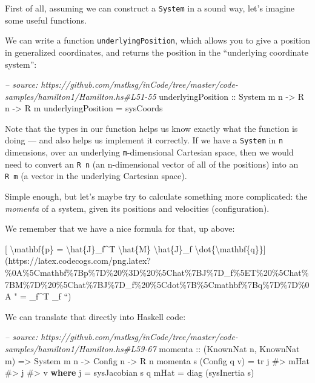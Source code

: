 \documentclass[]{article}
\newenvironment{Shaded}{}{}
\newcommand{\KeywordTok}[1]{\textcolor[rgb]{0.00,0.44,0.13}{\textbf{#1}}}
\newcommand{\DataTypeTok}[1]{\textcolor[rgb]{0.56,0.13,0.00}{#1}}
\newcommand{\CommentTok}[1]{\textcolor[rgb]{0.38,0.63,0.69}{\textit{#1}}}
\newcommand{\OtherTok}[1]{\textcolor[rgb]{0.00,0.44,0.13}{#1}}
\newcommand{\FunctionTok}[1]{\textcolor[rgb]{0.02,0.16,0.49}{#1}}
\newcommand{\NormalTok}[1]{#1}
\begin{document}
First of all, assuming we can construct a \texttt{System} in a sound way, let's
imagine some useful functions.

We can write a function \texttt{underlyingPosition}, which allows you to give a
position in generalized coordinates, and returns the position in the
``underlying coordinate system'':

\begin{Shaded}
\begin{Highlighting}[]
\CommentTok{-- source: https://github.com/mstksg/inCode/tree/master/code-samples/hamilton1/Hamilton.hs#L51-55}
\NormalTok{underlyingPosition}
\OtherTok{    ::} \DataTypeTok{System}\NormalTok{ m n}
    \OtherTok{->} \DataTypeTok{R}\NormalTok{ n}
    \OtherTok{->} \DataTypeTok{R}\NormalTok{ m}
\NormalTok{underlyingPosition }\FunctionTok{=}\NormalTok{ sysCoords}
\end{Highlighting}
\end{Shaded}

Note that the types in our function helps us know exactly what the function is
doing --- and also helps us implement it correctly. If we have a \texttt{System}
in \texttt{n} dimensions, over an underlying \texttt{m}-dimensional Cartesian
space, then we would need to convert an \texttt{R\ n} (an n-dimensional vector
of all of the positions) into an \texttt{R\ m} (a vector in the underlying
Cartesian space).

Simple enough, but let's maybe try to calculate something more complicated: the
\emph{momenta} of a system, given its positions and velocities (configuration).

We remember that we have a nice formula for that, up above:

{[} \textbackslash{}mathbf\{p\} = \textbackslash{}hat\{J\}\_f\^{}T
\textbackslash{}hat\{M\} \textbackslash{}hat\{J\}\_f
\textbackslash{}dot\{\textbackslash{}mathbf\{q\}\}{]}(https://latex.codecogs.com/png.latex?\%0A\%5Cmathbf\%7Bp\%7D\%20\%3D\%20\%5Chat\%7BJ\%7D\_f\%5ET\%20\%5Chat\%7BM\%7D\%20\%5Chat\%7BJ\%7D\_f\%20\%5Cdot\%7B\%5Cmathbf\%7Bq\%7D\%7D\%0A
"  = \_f\^{}T  \_f  ``)

We can translate that directly into Haskell code:

\begin{Shaded}
\begin{Highlighting}[]
\CommentTok{-- source: https://github.com/mstksg/inCode/tree/master/code-samples/hamilton1/Hamilton.hs#L59-67}
\NormalTok{momenta}
\OtherTok{    ::}\NormalTok{ (}\DataTypeTok{KnownNat}\NormalTok{ n, }\DataTypeTok{KnownNat}\NormalTok{ m)}
    \OtherTok{=>} \DataTypeTok{System}\NormalTok{ m n}
    \OtherTok{->} \DataTypeTok{Config}\NormalTok{ n}
    \OtherTok{->} \DataTypeTok{R}\NormalTok{ n}
\NormalTok{momenta s (}\DataTypeTok{Config}\NormalTok{ q v) }\FunctionTok{=}\NormalTok{ tr j }\FunctionTok{#>}\NormalTok{ mHat }\FunctionTok{#>}\NormalTok{ j }\FunctionTok{#>}\NormalTok{ v}
  \KeywordTok{where}
\NormalTok{    j    }\FunctionTok{=}\NormalTok{ sysJacobian s q}
\NormalTok{    mHat }\FunctionTok{=}\NormalTok{ diag (sysInertia s)}
\end{Highlighting}
\end{Shaded}
\end{document}
